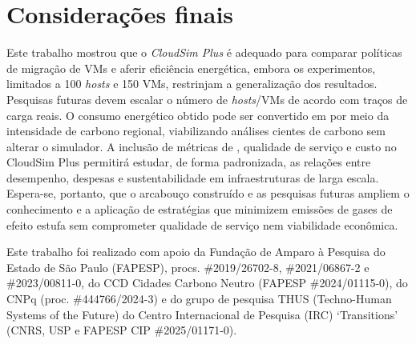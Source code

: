 \documentclass[12pt]{article}
\begin{document}
\section{Considerações finais}
Este trabalho mostrou que o \textit{CloudSim Plus} é adequado para comparar políticas de migração de VMs e aferir eficiência energética, embora os experimentos, limitados a 100 \textit{hosts} e 150 VMs, restrinjam a generalização dos resultados. Pesquisas futuras devem escalar o número de \textit{hosts}/VMs de acordo com traços de carga reais. O consumo energético obtido pode ser convertido em  por meio da intensidade de carbono regional, viabilizando análises cientes de carbono sem alterar o simulador. A inclusão de métricas de , qualidade de serviço e custo no CloudSim Plus permitirá estudar, de forma padronizada, as relações entre desempenho, despesas e sustentabilidade em infraestruturas de larga escala. Espera-se, portanto, que o arcabouço construído e as pesquisas futuras ampliem o conhecimento e a aplicação de estratégias que minimizem emissões de gases de efeito estufa sem comprometer qualidade de serviço nem viabilidade econômica.

Este trabalho foi realizado com apoio da Fundação de Amparo à Pesquisa do Estado de São Paulo (FAPESP), procs. \mbox{\#2019/26702-8}, \mbox{\#2021/06867-2} e \mbox{\#2023/00811-0}, do CCD Cidades Carbono Neutro (FAPESP \mbox{\#2024/01115-0}), do CNPq (proc. \mbox{\#444766/2024-3}) e do grupo de pesquisa THUS (Techno-Human Systems of the Future) do Centro Internacional de Pesquisa (IRC) `Transitions' (CNRS, USP e FAPESP CIP \mbox{\#2025/01171-0}).

\renewcommand{\refname}{Referências}


\end{document}
